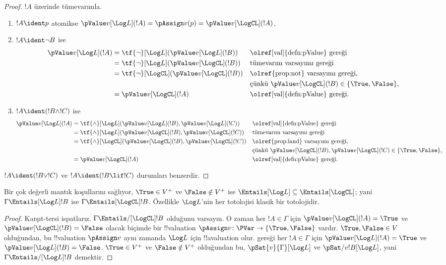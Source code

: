 \begin{proof}
  $!A$ üzerinde tümevarımla.
  \begin{enumerate}
  \item $!A\ident p$ atomikse
  $\pValue v[\Log L](!A)=\pAssign v(p)=\pValue v[\LogCL](!A)$.
  \item $!A\ident\lnot B$ ise
  \begin{align*}
    \pValue v[\Log L](!A) & = \tf{\lnot}[\Log L](\pValue v[\Log L](!B)) & &\text{\olref[val]{defn:pValue} gereği}\\
    & = \tf{\lnot}[\Log L](\pValue v[\LogCL](!B)) && \text{tümevarım varsayımı gereği}\\
    & = \tf{\lnot}[\LogCL](\pValue v[\LogCL](!B)) 
&&\text{\olref{prop:not} varsayımı gereği,}\\
&&&\text{çünkü $\pValue v[\LogCL](!B) \in \{\True, \False\}$,}\\
& = \pValue v[\LogCL](!A) &&\text{\olref[val]{defn:pValue} gereği}.
\end{align*}
\item $!A\ident(!B\land !C)$ ise
\begin{align*}
  \pValue v[\Log L](!A) & = \tf{\land}[\Log L](\pValue v[\Log L](!B), \pValue v[\Log L](!C)) & &\text{\olref[val]{defn:pValue} gereği}\\
  & = \tf{\land}[\Log L](\pValue v[\LogCL](!B),\pValue v[\LogCL](!C)) && \text{tümevarım varsayımı gereği}\\
  & = \tf{\land}[\LogCL](\pValue v[\LogCL](!B),\pValue v[\LogCL](!C)) 
&&\text{\olref{prop:land} varsayımı gereği,}\\
&&&\text{çünkü $\pValue v[\LogCL](!B),\pValue v[\LogCL](!C) \in \{\True, \False\}$,}\\
& = \pValue v[\LogCL](!A) &&\text{\olref[val]{defn:pValue} gereği}.
\end{align*}
\end{enumerate}
$!A\ident(!B\lor !C)$ ve $!A\ident(!B\lif !C)$ durumları benzerdir.
\end{proof}

\begin{cor}
  Bir çok değerli mantık  koşullarını sağlıyor,
  $\True\in V^+$ ve $\False\notin V^+$ ise
  ${\Entails[\Log L]}\subseteq{\Entails[\LogCL]}$; yani
  $\Gamma\Entails[\Log L]!B$ ise $\Gamma\Entails[\LogCL]!B$. Özellikle
  $\Log L$'nin her totolojisi klasik bir totolojidir.
\end{cor}

\begin{proof}
  Karşıt-tersi ispatlarız. $\Gamma\Entails/[\LogCL]!B$ olduğunu varsayın.
  O zaman her $!A\in\Gamma$ için $\pValue v[\LogCL](!A)=\True$ ve
  $\pValue v[\LogCL](!B)=\False$ olacak biçimde bir
  !!{valuation} $\pAssign v\colon\PVar\to\{\True,\False\}$ vardır.
  $\True,\False\in V$ olduğundan, bu !!{valuation} $\pAssign v$ aynı zamanda
  $\Log L$ için !!a{valuation} olur.  gereği her
  $!A\in\Gamma$ için $\pValue v[\Log L](!A)=\True$ ve
  $\pValue v[\Log L](!B)=\False$. $\True\in V^+$ ve $\False\notin V^+$
  olduğundan bu, $\pSat{v}{\Gamma}[\Log L]$ ve
  $\pSat/{v}{!B}[\Log L]$, yani
  $\Gamma\Entails/[\Log L]!B$ demektir.
\end{proof}
